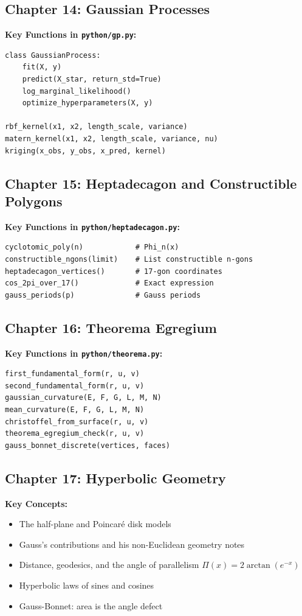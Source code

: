 \documentclass[11pt,a4paper]{article}
\begin{document}
\subsection{Chapter 14: Gaussian Processes}

\textbf{Key Functions in \texttt{python/gp.py}:}
\begin{lstlisting}[style=python]
class GaussianProcess:
    fit(X, y)
    predict(X_star, return_std=True)
    log_marginal_likelihood()
    optimize_hyperparameters(X, y)

rbf_kernel(x1, x2, length_scale, variance)
matern_kernel(x1, x2, length_scale, variance, nu)
kriging(x_obs, y_obs, x_pred, kernel)
\end{lstlisting}

\subsection{Chapter 15: Heptadecagon and Constructible Polygons}

\textbf{Key Functions in \texttt{python/heptadecagon.py}:}
\begin{lstlisting}[style=python]
cyclotomic_poly(n)            # Phi_n(x)
constructible_ngons(limit)    # List constructible n-gons
heptadecagon_vertices()       # 17-gon coordinates
cos_2pi_over_17()             # Exact expression
gauss_periods(p)              # Gauss periods
\end{lstlisting}

\subsection{Chapter 16: Theorema Egregium}

\textbf{Key Functions in \texttt{python/theorema.py}:}
\begin{lstlisting}[style=python]
first_fundamental_form(r, u, v)
second_fundamental_form(r, u, v)
gaussian_curvature(E, F, G, L, M, N)
mean_curvature(E, F, G, L, M, N)
christoffel_from_surface(r, u, v)
theorema_egregium_check(r, u, v)
gauss_bonnet_discrete(vertices, faces)
\end{lstlisting}

\subsection{Chapter 17: Hyperbolic Geometry}

\textbf{Key Concepts:}
\begin{itemize}
    \item The half-plane and Poincar\'e disk models
    \item Gauss's contributions and his non-Euclidean geometry notes
    \item Distance, geodesics, and the angle of parallelism $\Pi(x) = 2\arctan(e^{-x})$
    \item Hyperbolic laws of sines and cosines
    \item Gauss-Bonnet: area is the angle defect
\end{itemize}
\end{document}
